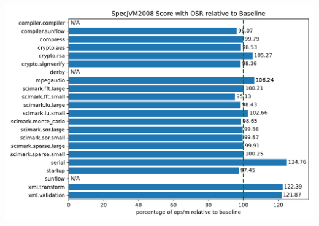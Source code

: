 \documentclass[draft,final]{vutinfth} %
\begin{document}
    \includegraphics[width=\textwidth]{../evaluation/specjvm/plots/plot_normalized}


    \backmatter




    \printindex


%
    
    
\end{document}
